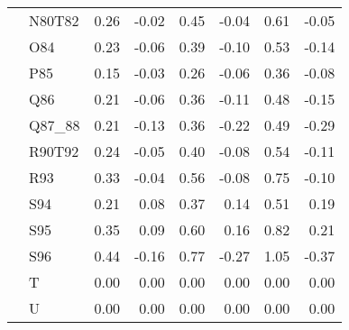\begin{tabular}{llrrrrrr}
 & N80T82 & 0.26 & -0.02 & 0.45 & -0.04 & 0.61 & -0.05 \\
 & O84 & 0.23 & -0.06 & 0.39 & -0.10 & 0.53 & -0.14 \\
 & P85 & 0.15 & -0.03 & 0.26 & -0.06 & 0.36 & -0.08 \\
 & Q86 & 0.21 & -0.06 & 0.36 & -0.11 & 0.48 & -0.15 \\
 & Q87\_88 & 0.21 & -0.13 & 0.36 & -0.22 & 0.49 & -0.29 \\
 & R90T92 & 0.24 & -0.05 & 0.40 & -0.08 & 0.54 & -0.11 \\
 & R93 & 0.33 & -0.04 & 0.56 & -0.08 & 0.75 & -0.10 \\
 & S94 & 0.21 & 0.08 & 0.37 & 0.14 & 0.51 & 0.19 \\
 & S95 & 0.35 & 0.09 & 0.60 & 0.16 & 0.82 & 0.21 \\
 & S96 & 0.44 & -0.16 & 0.77 & -0.27 & 1.05 & -0.37 \\
 & T & 0.00 & 0.00 & 0.00 & 0.00 & 0.00 & 0.00 \\
 & U & 0.00 & 0.00 & 0.00 & 0.00 & 0.00 & 0.00 \\
\cline{1-8}
\bottomrule
\end{tabular}
